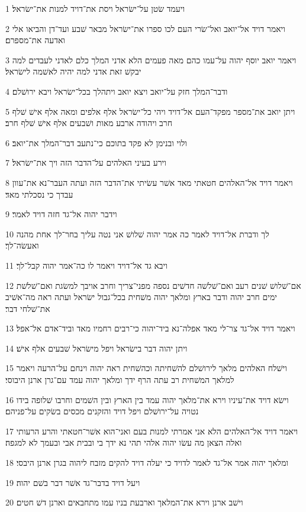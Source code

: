 \par 1 ויעמד שׂטן על־ישׂראל ויסת את־דויד למנות את־ישׂראל׃
\par 2 ויאמר דויד אל־יואב ואל־שׂרי העם לכו ספרו את־ישׂראל מבאר שׁבע ועד־דן והביאו אלי ואדעה את־מספרם׃
\par 3 ויאמר יואב יוסף יהוה על־עמו כהם מאה פעמים הלא אדני המלך כלם לאדני לעבדים למה יבקשׁ זאת אדני למה יהיה לאשׁמה לישׂראל׃
\par 4 ודבר־המלך חזק על־יואב ויצא יואב ויתהלך בכל־ישׂראל ויבא ירושׁלם׃
\par 5 ויתן יואב את־מספר מפקד־העם אל־דויד ויהי כל־ישׂראל אלף אלפים ומאה אלף אישׁ שׁלף חרב ויהודה ארבע מאות ושׁבעים אלף אישׁ שׁלף חרב׃
\par 6 ולוי ובנימן לא פקד בתוכם כי־נתעב דבר־המלך את־יואב׃
\par 7 וירע בעיני האלהים על־הדבר הזה ויך את־ישׂראל׃
\par 8 ויאמר דויד אל־האלהים חטאתי מאד אשׁר עשׂיתי את־הדבר הזה ועתה העבר־נא את־עוון עבדך כי נסכלתי מאד׃
\par 9 וידבר יהוה אל־גד חזה דויד לאמר׃
\par 10 לך ודברת אל־דויד לאמר כה אמר יהוה שׁלושׁ אני נטה עליך בחר־לך אחת מהנה ואעשׂה־לך׃
\par 11 ויבא גד אל־דויד ויאמר לו כה־אמר יהוה קבל־לך׃
\par 12 אם־שׁלושׁ שׁנים רעב ואם־שׁלשׁה חדשׁים נספה מפני־צריך וחרב אויבך למשׂגת ואם־שׁלשׁת ימים חרב יהוה ודבר בארץ ומלאך יהוה משׁחית בכל־גבול ישׂראל ועתה ראה מה־אשׁיב את־שׁלחי דבר׃
\par 13 ויאמר דויד אל־גד צר־לי מאד אפלה־נא ביד־יהוה כי־רבים רחמיו מאד וביד־אדם אל־אפל׃
\par 14 ויתן יהוה דבר בישׂראל ויפל מישׂראל שׁבעים אלף אישׁ׃
\par 15 וישׁלח האלהים מלאך לירושׁלם להשׁחיתה וכהשׁחית ראה יהוה וינחם על־הרעה ויאמר למלאך המשׁחית רב עתה הרף ידך ומלאך יהוה עמד עם־גרן ארנן היבוסי׃
\par 16 וישׂא דויד את־עיניו וירא את־מלאך יהוה עמד בין הארץ ובין השׁמים וחרבו שׁלופה בידו נטויה על־ירושׁלם ויפל דויד והזקנים מכסים בשׂקים על־פניהם׃
\par 17 ויאמר דויד אל־האלהים הלא אני אמרתי למנות בעם ואני־הוא אשׁר־חטאתי והרע הרעותי ואלה הצאן מה עשׂו יהוה אלהי תהי נא ידך בי ובבית אבי ובעמך לא למגפה׃
\par 18 ומלאך יהוה אמר אל־גד לאמר לדויד כי יעלה דויד להקים מזבח ליהוה בגרן ארנן היבסי׃
\par 19 ויעל דויד בדבר־גד אשׁר דבר בשׁם יהוה׃
\par 20 וישׁב ארנן וירא את־המלאך וארבעת בניו עמו מתחבאים וארנן דשׁ חטים׃
